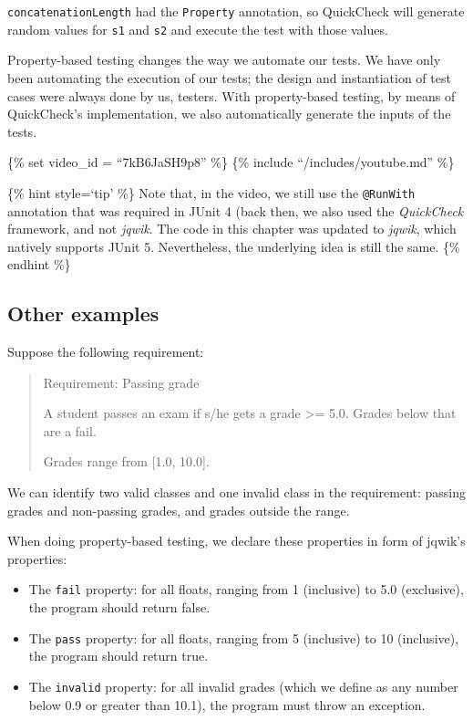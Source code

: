 \texttt{concatenationLength} had the \texttt{Property} annotation, so
QuickCheck will generate random values for \texttt{s1} and \texttt{s2}
and execute the test with those values.

Property-based testing changes the way we automate our tests. We have
only been automating the execution of our tests; the design and
instantiation of test cases were always done by us, testers. With
property-based testing, by means of QuickCheck's implementation, we also
automatically generate the inputs of the tests.

\{\% set video\_id = ``7kB6JaSH9p8'' \%\} \{\% include
``/includes/youtube.md'' \%\}

\{\% hint style=`tip' \%\} Note that, in the video, we still use the
\texttt{@RunWith} annotation that was required in JUnit 4 (back then, we
also used the \emph{QuickCheck} framework, and not \emph{jqwik}. The
code in this chapter was updated to \emph{jqwik}, which natively
supports JUnit 5. Nevertheless, the underlying idea is still the same.
\{\% endhint \%\}

\hypertarget{other-examples}{%
\subsection{Other examples}\label{other-examples}}

Suppose the following requirement:

\begin{quote}
Requirement: Passing grade

A student passes an exam if s/he gets a grade \textgreater= 5.0. Grades
below that are a fail.

Grades range from {[}1.0, 10.0{]}.
\end{quote}

We can identify two valid classes and one invalid class in the
requirement: passing grades and non-passing grades, and grades outside
the range.

When doing property-based testing, we declare these properties in form
of jqwik's properties:

\begin{itemize}
\tightlist
\item
  The \texttt{fail} property: for all floats, ranging from 1 (inclusive)
  to 5.0 (exclusive), the program should return false.
\item
  The \texttt{pass} property: for all floats, ranging from 5 (inclusive)
  to 10 (inclusive), the program should return true.
\item
  The \texttt{invalid} property: for all invalid grades (which we define
  as any number below 0.9 or greater than 10.1), the program must throw
  an exception.
\end{itemize}

